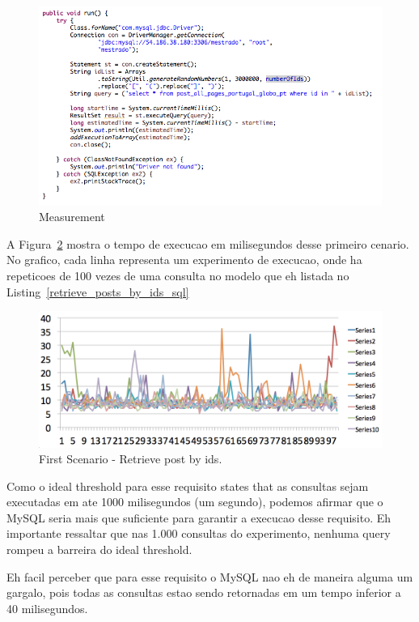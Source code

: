 \begin{figure}[ht!]
\centering
\includegraphics[width=120mm]{Imagens/core-execution-01.png}
\caption{Measurement\label{fig:core-execution-01}}
\end{figure}

A Figura~\ref{fig:first_scenario} mostra o tempo de execucao em milisegundos desse primeiro cenario. No grafico, cada linha representa um experimento de execucao, onde ha repeticoes de 100 vezes de uma consulta no modelo que eh listada no Listing~\ref{retrieve_posts_by_ids_sql}

\begin{figure}[ht!]
\centering
\includegraphics[width=120mm]{Imagens/execution-01.png}
\caption{First Scenario - Retrieve post by ids.\label{fig:first_scenario}}
\end{figure}


Como o ideal threshold para esse requisito states that as consultas sejam executadas em ate 1000 milisegundos (um segundo), podemos afirmar que o MySQL seria mais que suficiente para garantir a execucao desse requisito. Eh importante ressaltar que nas 1.000 consultas do experimento, nenhuma query rompeu a barreira do ideal threshold. 

Eh facil perceber que para esse requisito o MySQL nao eh de maneira alguma um gargalo, pois todas as consultas estao sendo retornadas em um tempo inferior a 40 milisegundos. 

